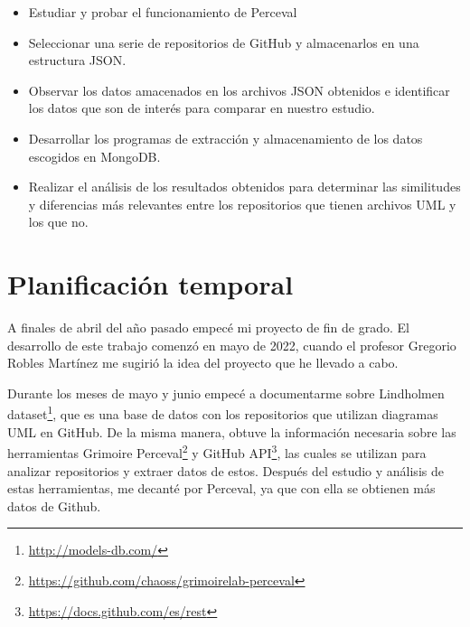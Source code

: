 \documentclass[a4paper, 12pt]{book}
\begin{document}
\begin{itemize}
  \item Estudiar y probar el funcionamiento de Perceval
  \item Seleccionar una serie de repositorios de GitHub y almacenarlos en una estructura JSON.
  \item Observar los datos amacenados en los archivos JSON obtenidos e identificar los datos que son de interés para comparar en nuestro estudio.
  \item Desarrollar los programas de extracción y almacenamiento de los datos escogidos en MongoDB.  
  \item Realizar el análisis de los resultados obtenidos para determinar las similitudes y diferencias más relevantes entre los repositorios que tienen archivos UML y los que no.
\end{itemize}


\section{Planificación temporal}
\label{sec:planificacion-temporal}




A finales de abril del año pasado empecé mi proyecto de fin de grado. 
El desarrollo de este trabajo comenzó en mayo de 2022, cuando el profesor Gregorio Robles Martínez me sugirió la idea del proyecto que he llevado a cabo. 


Durante los meses de mayo y junio empecé a documentarme sobre Lindholmen dataset\footnote{\url{http://models-db.com/}}, que es una base de datos con los repositorios que utilizan diagramas UML en GitHub.
De la misma manera, obtuve la información necesaria sobre las herramientas Grimoire Perceval\footnote{\url{https://github.com/chaoss/grimoirelab-perceval}} y GitHub API\footnote{\url{https://docs.github.com/es/rest}}, las cuales se utilizan para analizar repositorios y extraer datos de estos. 
Después del estudio y análisis de estas herramientas, me decanté por Perceval, ya que con ella se obtienen más datos de Github.
\end{document}
